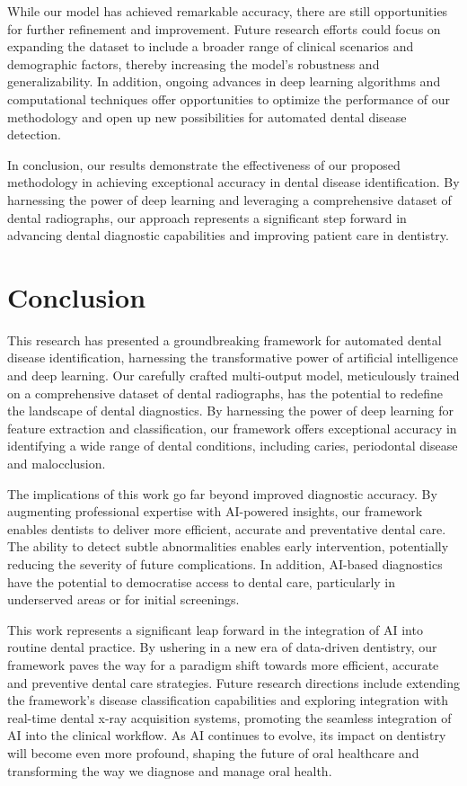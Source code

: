 \documentclass[journal,twoside,web]{ieeecolor}
\begin{document}
While our model has achieved remarkable accuracy, there are still opportunities for further refinement and improvement. Future research efforts could focus on expanding the dataset to include a broader range of clinical scenarios and demographic factors, thereby increasing the model's robustness and generalizability. In addition, ongoing advances in deep learning algorithms and computational techniques offer opportunities to optimize the performance of our methodology and open up new possibilities for automated dental disease detection.

In conclusion, our results demonstrate the effectiveness of our proposed methodology in achieving exceptional accuracy in dental disease identification. By harnessing the power of deep learning and leveraging a comprehensive dataset of dental radiographs, our approach represents a significant step forward in advancing dental diagnostic capabilities and improving patient care in dentistry.

\section{Conclusion}
This research has presented a groundbreaking framework for automated dental disease identification, harnessing the transformative power of artificial intelligence and deep learning. Our carefully crafted multi-output model, meticulously trained on a comprehensive dataset of dental radiographs, has the potential to redefine the landscape of dental diagnostics. By harnessing the power of deep learning for feature extraction and classification, our framework offers exceptional accuracy in identifying a wide range of dental conditions, including caries, periodontal disease and malocclusion.

The implications of this work go far beyond improved diagnostic accuracy. By augmenting professional expertise with AI-powered insights, our framework enables dentists to deliver more efficient, accurate and preventative dental care. The ability to detect subtle abnormalities enables early intervention, potentially reducing the severity of future complications. In addition, AI-based diagnostics have the potential to democratise access to dental care, particularly in underserved areas or for initial screenings.

This work represents a significant leap forward in the integration of AI into routine dental practice. By ushering in a new era of data-driven dentistry, our framework paves the way for a paradigm shift towards more efficient, accurate and preventive dental care strategies.  Future research directions include extending the framework's disease classification capabilities and exploring integration with real-time dental x-ray acquisition systems, promoting the seamless integration of AI into the clinical workflow. As AI continues to evolve, its impact on dentistry will become even more profound, shaping the future of oral healthcare and transforming the way we diagnose and manage oral health.
\end{document}
